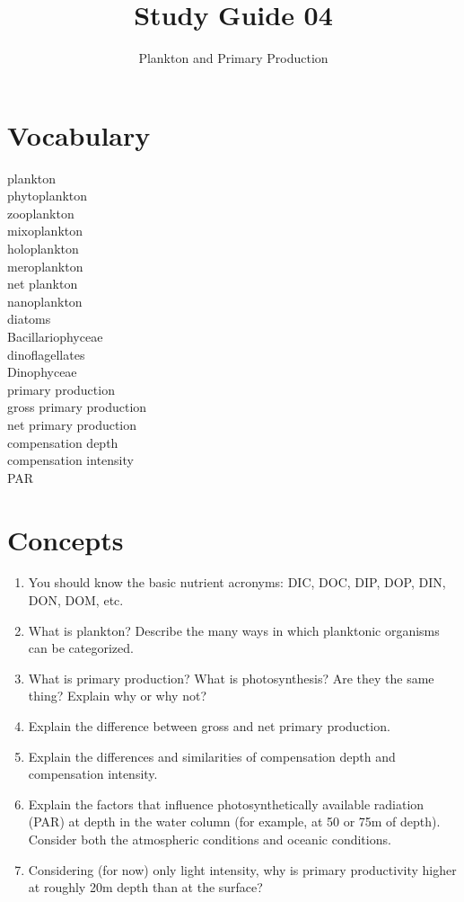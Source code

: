 \documentclass[nofonts, letterpaper]{tufte-handout}
\title{Study Guide 04}
\author{Plankton and Primary Production}
\date{} %
\begin{document}
\maketitle	%


\section{Vocabulary}
\vspace{-1\baselineskip}
\begin{multicols}{2}
plankton \\
phytoplankton \\
zooplankton \\
mixoplankton \\
holoplankton \\
meroplankton \\
net plankton \\
nanoplankton \\
diatoms \\
Bacillariophyceae \\
dinoflagellates \\
Dinophyceae \\
primary production \\
gross primary production \\
net primary production \\
compensation depth \\
compensation intensity \\
PAR
\end{multicols}

\section{Concepts}

\begin{enumerate}
\item
  You should know the basic nutrient acronyms: DIC, DOC, DIP, DOP, DIN,
  DON, DOM, etc.
\item
  What is plankton? Describe the many ways in which planktonic organisms
  can be categorized.
\item
  What is primary production? What is photosynthesis? Are they the same
  thing? Explain why or why not?
\item
  Explain the difference between gross and net primary production.
\item
  Explain the differences and similarities of compensation depth and
  compensation intensity.
\item
  Explain the factors that influence photosynthetically available
  radiation (PAR) at depth in the water column (for example, at 50 or
  75m of depth). Consider both the atmospheric conditions and oceanic
  conditions.
\item
  Considering (for now) only light intensity, why is primary
  productivity higher at roughly 20m depth than at the surface?
 \end{enumerate}
\end{document}

